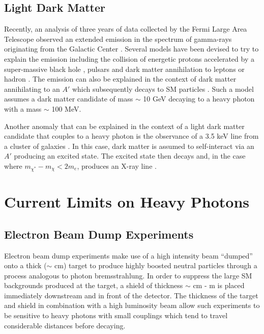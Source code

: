 
\subsection{Light Dark Matter}

Recently, an analysis of three years of data collected by the Fermi Large Area
Telescope observed an extended emission in the spectrum of gamma-rays 
originating from the Galactic Center 
\cite{hooper2011, linden2011, abazajian2012, hooper2013}.  Several models have been 
devised to try to explain the emission including the collision of energetic 
protons accelerated by a super-massive black hole \cite{Hooper:2010mq}, 
pulsars \cite{Abazajian:2010zy} and dark matter annihilation to leptons or 
hadron \cite{Hooper:2010mq, Goodenough:2009gk}.  The emission can also
be explained in the context of dark matter annihilating to an $A'$ which 
subsequently decays to SM particles \cite{Hooper:2012cw}.  Such a model assumes
a dark matter candidate of mass $\sim$ 10 GeV decaying to a heavy photon
with a mass $\sim$ 100 MeV. 

Another anomaly that can be explained in the context of a light dark matter
candidate that couples to a heavy photon is the observance
of a 3.5 keV line from a cluster of galaxies \cite{Bulbul:2014sua}.  In this case, 
dark matter is assumed to self-interact via an $A'$ producing an excited state.
The excited state then decays and, in the case where 
$m_{\chi^*} - m_{\chi} < 2m_e$, produces an X-ray line 
\cite{Finkbeiner:2014sja}.

\section{Current Limits on Heavy Photons}

\subsection{Electron Beam Dump Experiments}

Electron beam dump experiments make use of a high intensity beam ``dumped'' onto
a thick ($\sim$ cm) target to produce highly boosted neutral particles through a 
process analogous to photon bremsstrahlung.  In order to suppress the large
SM backgrounds produced at the target, a shield of thickness $\sim$ cm - m
is placed immediately downstream and in front of the detector.
The thickness of the target and shield in combination with a high luminosity
beam allow such experiments to be sensitive to heavy photons with small 
couplings which tend to travel considerable distances before decaying.

